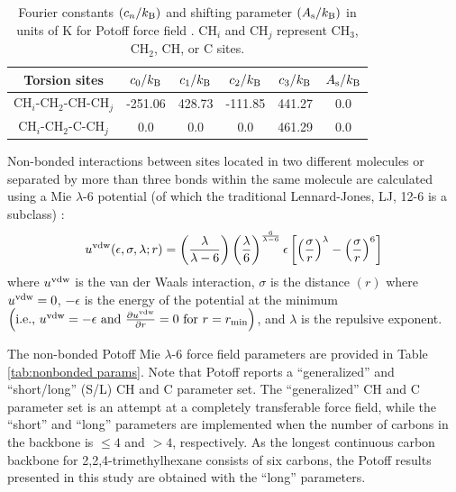 \documentclass[preprint,review,12pt]{elsarticle}
\begin{document}
	\begin{table}[h!]
		\caption{Fourier constants $(c_n/k_{\rm B})$ and shifting parameter $(A_{\rm s}/k_{\rm B})$ in units of K for Potoff force field  \cite{Martin1999,Potoff_branched}. CH$_i$ and CH$_j$ represent CH$_3$, CH$_2$, CH, or C sites.} \label{tab:torsions}
		\begin{center}
			\begin{tabular}{|c|c|c|c|c|c|}
				\hline
				Torsion sites & $c_0/k_{\rm B}$ & $c_1/k_{\rm B}$ & $c_2/k_{\rm B}$ & $c_3/k_{\rm B}$ & $A_{\rm s}/k_{\rm B}$ \\ \hline
				CH$_i$-CH$_2$-CH-CH$_j$ & -251.06 & 428.73 & -111.85 & 441.27 & 0.0 \\
				CH$_i$-CH$_2$-C-CH$_j$ & 0.0 & 0.0 & 0.0 & 461.29 & 0.0 \\
				\hline
			\end{tabular}
		\end{center} 
	\end{table}
	
	Non-bonded interactions between sites located in two different molecules or separated by more than three bonds within the same molecule are calculated using a Mie $\lambda$-6 potential (of which the traditional Lennard-Jones, LJ, 12-6 is a subclass) \cite{Herdes2015}:
	\begin{equation} \label{eq:Mie}
	u^{\rm vdw}(\epsilon,\sigma,\lambda;r) = \left(\frac{\lambda}{\lambda - 6}\right)\left(\frac{\lambda}{6}\right)^{\frac{6}{\lambda - 6}} \epsilon \left[\left(\frac{\sigma}{r}\right)^{\lambda} - \left(\frac{\sigma}{r}\right)^6\right]
	\end{equation} 
	where $u^{\rm vdw}$ is the van der Waals interaction, $\sigma$ is the distance $(r)$ where $u^{\rm vdw} = 0$, $-\epsilon$ is the energy of the potential at the minimum $\left(\text{i.e., }u^{\rm vdw} = -\epsilon \text{ and } \frac{\partial u^{\rm vdw}}{\partial r} = 0 \text{ for } r=r_{\rm min} \right)$, and $\lambda$ is the repulsive exponent. 
	
	The non-bonded Potoff Mie $\lambda$-6 force field parameters are provided in Table \ref{tab:nonbonded params}. Note that Potoff reports a ``generalized'' and ``short/long'' (S/L) CH and C parameter set. The ``generalized'' CH and C parameter set is an attempt at a completely transferable force field, while the ``short'' and ``long'' parameters are implemented when the number of carbons in the backbone is $\le 4$ and $> 4$, respectively. As the longest continuous carbon backbone for 2,2,4-trimethylhexane consists of six carbons, the Potoff results presented in this study are obtained with the ``long'' parameters.
	
\end{document}
